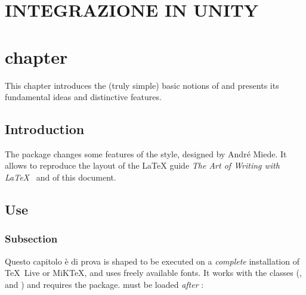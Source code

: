 \chapter{INTEGRAZIONE IN UNITY}
\label{chp:Intergrazione in Unity}

\chapter{chapter}
\label{chp:chapter}

This chapter introduces the (truly simple) basic notions of \arsclassica{} and presents its fundamental ideas and distinctive features.

\section{Introduction}

The \arsclassica{} package changes some features of the \classicthesis{} style, designed by Andr\'e Miede. It allows to reproduce the layout of the \LaTeX{} guide \emph{The Art of Writing with \LaTeX}~\parencite{pantieri:arte} and of this document.

\section{Use}

\subsection*{Subsection}

Questo capitolo è di prova is shaped to be executed on a \emph{complete} installation of \TeX{}~Live or MiK\TeX, and uses freely available fonts.
It works with the  classes (,  and ) and requires the  package. \arsclassica{} must be loaded \emph{after} :

